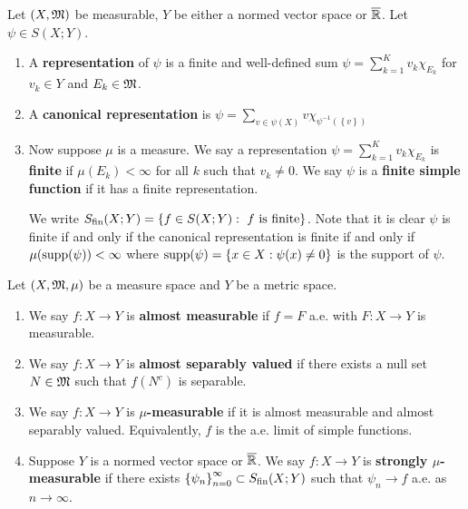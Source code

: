 \documentclass[a4paper]{article}
\begin{document}
\begin{defi}
  
Let $(X, \mathfrak{M})$ be measurable, $Y$ be either a normed vector
space or $\overline{\mathbb{R}}$. Let $\psi \in S(X; Y)$.
\begin{enumerate}
  \item A \textbf{representation} of $\psi$ is a finite and 
  well-defined sum 
  $\psi = \sum_{k=1}^K v_k \chi_{E_k}$ 
  for $v_k \in Y$ and $E_k \in \mathfrak{M}$.
  
  \item A \textbf{canonical representation} is 
  $\psi = \sum_{v \in \psi(X)} v \chi_{\psi^{-1}
  (\left\{ v \right\})}$
  \item Now suppose $\mu$ is a measure.
  We say a representation $\psi = \sum_{k=1}^K 
  v_k \chi_{E_k}$ is \textbf{finite} if $\mu(E_k) < \infty$
  for all $k$ such that $v_k \neq 0$. We 
  say $\psi$ is a \textbf{finite simple function} if it has a 
  finite representation.
  
  We write $S_{\text{fin}}(X; Y) = \left\{ 
    f \in S(X; Y) : \text{ $f$ is finite}
   \right\}$.
  Note that it is clear $\psi$ is finite if and only if 
  the canonical representation is finite if and only if 
  $\mu(\operatorname{supp}(\psi)) < \infty$ where 
  $\operatorname{supp}(\psi) = \left\{ x \in X : \psi(x) \neq 0 \right\}$
  is the support of $\psi$.
\end{enumerate}

\end{defi}

\begin{defi}
  Let $(X, \mathfrak{M}, \mu)$ be a measure space and $Y$ be a metric 
  space. 
  \begin{enumerate}
    \item We say $f : X \to Y$ is \textbf{almost measurable} 
    if $f = F$ a.e. with $F: X \to Y$ is measurable.
    
    \item We say $f : X \to Y$ is \textbf{almost separably valued}
    if there exists a null set $N \in \mathfrak{M}$ such that 
    $f(N^c)$ is separable.
    
    \item We say $f: X \to Y$ is \textbf{$\mu$-measurable} if 
    it is almost measurable and almost separably valued.
    Equivalently, $f$ is the a.e. limit of simple functions.

    \item Suppose $Y$ is a normed vector space or $\overline{\mathbb{R}}$.
    We say $f: X \to Y$ is \textbf{strongly $\mu$-measurable} 
    if there exists $\left\{ \psi_n \right\}_{n=0}^\infty \subset S_{\text{fin}}(X; Y)$
    such that $\psi_n \to f$ a.e. as $n \to \infty$.
  \end{enumerate}
\end{defi}
\end{document}
